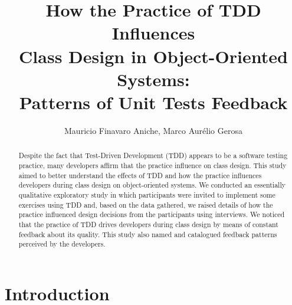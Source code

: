 \documentclass[times]{speauth}
\begin{document}

\title{How the Practice of TDD Influences \\Class Design in Object-Oriented Systems: \\Patterns of Unit Tests Feedback}

\author{Mauricio Finavaro Aniche, Marco Aurélio Gerosa}

\address{
	Department of Computer Sciences\\ 
	Institute of Mathematics and Statistics\\ 
	University of São Paulo (USP)\\ 
	PO Box 66.281 - 05.508-090 - São Paulo - SP - Brazil\\
}

\begin{abstract}

	Despite the fact that Test-Driven Development (TDD) appears to be a software testing practice, 
	many developers affirm that the practice influence on class design. This study aimed
	to better understand the effects of TDD and how the practice influences developers
	during class design on object-oriented systems. 
	We conducted an essentially qualitative exploratory study in which participants
	were invited to implement some exercises using TDD and, based on the data gathered,
	we raised details of how the practice influenced design decisions from the
	participants using interviews.
	We noticed that the practice of TDD drives
	developers during class design by means of constant feedback about its quality. This study
	also named and catalogued feedback patterns perceived by the developers.
	
\end{abstract}


\maketitle

\vspace{-6pt}

\section{Introduction}
\end{document}
